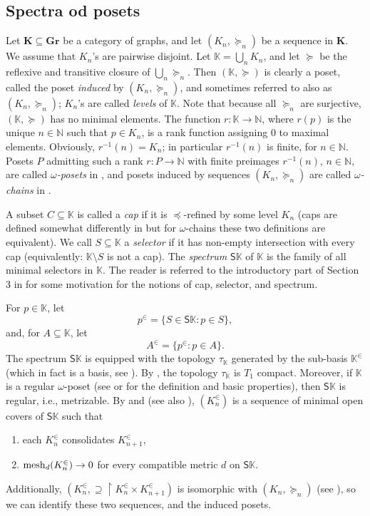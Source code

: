 \documentclass[12pt]{amsart}
\numberwithin{equation}{section}
\theoremstyle{plain}
\theoremstyle{definition}
\newcommand \Sp{{\mathsf{S}}}
\newcommand \mesh{{\rm{ mesh}}}
\newcommand \uhr{\upharpoonright}
\newcommand \GGRb{\mathbf{Gr}}
\newcommand \KKb{\mathbf{K}}
\newcommand \KK{\mathbb{K}}
\newcommand \NN{\mathbb{N}}
\begin{document}
\subsection{Spectra od posets}
Let $\KKb \subseteq \GGRb$ be a category of graphs, and let $(K_n, \succeq_n)$ be a sequence in $\KKb$. We assume that $K_n$'s are pairwise disjoint. Let $\KK=\bigcup_n K_n$, and let $\succeq$ be the reflexive and transitive closure of $\bigcup_n \succeq_n$. Then $(\KK,\succeq)$ is clearly a poset, called the poset \emph{induced} by $(K_n, \succeq_n)$, and sometimes referred to also as $(K_n, \succeq_n)$; $K_n$'s are called \emph{levels} of $\KK$. Note that because all $\succeq_n$ are surjective, $(\KK,\succeq)$ has no minimal elements. The function $r:\KK \to \NN$, where $r(p)$ is the unique $n \in \NN$ such that $p \in K_n$, is a rank function assigning $0$ to maximal elements. Obviously, $r^{-1}(n)=K_n$; in particular $r^{-1}(n)$ is finite, for $n \in \NN$. Posets $P$ admitting such a rank $r:P \to \NN$ with finite preimages $r^{-1}(n)$, $n \in \NN$, are called \emph{$\omega$-posets} in \cite{BaBiVi}, and posets induced by sequences $(K_n, \succeq_n)$ are called \emph{$\omega$-chains} in \cite{Ma}. 

A subset $C \subseteq \KK$ is called a \emph{cap} if it is  $\preceq$-refined by some level $K_n$ (caps are defined somewhat differently in \cite{BaBiVi} but for $\omega$-chains these two definitions are equivalent). We call $S \subseteq \KK$ a \emph{selector} if it has non-empty intersection with every cap (equivalently: $\KK \setminus S$ is not a cap).  The \emph{spectrum} $\Sp \KK$ of $\KK$ is the family of all minimal selectors in $\KK$. The reader is referred to the introductory part of Section 3 in \cite{Ma} for some motivation for the notions of cap, selector, and spectrum.

 For $p \in \KK$, let $$p^\in=\{S \in \Sp \KK: p \in S \},$$ and, for $A \subseteq \KK$, let $$A^\in=\{p^\in: p \in A \}.$$ The spectrum $\Sp \KK$ is equipped with the topology $\tau_\KK$ generated by the sub-basis $\KK^\in$ (which in fact is a basis, see \cite[Corollary 2.14]{BaBiVi}).  By \cite[Proposition 2.8]{BaBiVi}, the topology $\tau_\KK$ is $T_1$ compact. Moreover, if $\KK$ is a regular $\omega$-poset (see \cite{BaBiVi} or \cite{Ma} for the definition and basic properties), then $\Sp \KK$  is regular, i.e., metrizable. By \cite[Propositions 1.7]{BaBiVi} and \cite[Propositions 2.8]{BaBiVi} (see also \cite[Proposition 3.12]{Ma}), $(K^\in_n)$ is a sequence of minimal open covers of $\Sp \KK$ such that
%
\begin{enumerate}
	\item each $K^\in_n$ consolidates $K^\in_{n+1}$,
	\item $\mesh_d(K^\in_{n}) \to 0$ for every compatible metric $d$ on $\Sp \KK$.
\end{enumerate}
%
Additionally, $(K^\in_n,\supseteq \uhr K^\in_{n} \times K^\in_{n+1})$ is isomorphic with $(K_n, \succeq_n)$ (see \cite[Corollary 3.17]{Ma}), so we can identify these two sequences, and the induced posets. 
\end{document}
